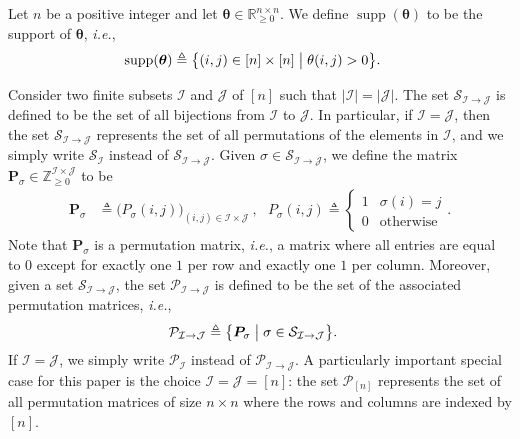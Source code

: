 \documentclass[journal,lettersize,twocolumn]{IEEEtran} %
\newcommand{\set}[1]{\mathcal{#1}}
\newcommand{\sR}{\mathbb{R}}
\newcommand{\sZ}{\mathbb{Z}}
\newcommand{\matr}[1]{ \bm{#1} }
\newcommand{\defeq}{ \triangleq }
\newcommand{\setP}{\set{P}}
\newcommand{\setS}{\set{S}}
\newcommand{\mtheta}{\matr{\theta}}
\newcommand{\sZp}{\sZ_{\geq 0}}
\newcommand{\mP}{\matr{P}}
\newcommand{\suppmtheta}{\operatorname{supp}(\mtheta)}
\newcommand{\ie}{\textit{i.e.}}
\begin{document}
%

Let $n$ be a positive integer and let $\mtheta \in \sR_{\geq 0}^{n \times
  n}$. We define $\suppmtheta$ to be the support of $\mtheta$, \ie,
\begin{align*}
  \suppmtheta 
    &\defeq
       \bigl\{ 
         (i,j) \in [n] \times [n] 
       \bigm|
         \theta(i,j) > 0
       \bigr\}.
\end{align*}

%

Consider two finite subsets $ \set{I} $ and $ \set{J} $ of $[n]$ such that
$ |\set{I}| = | \set{J} | $. The set $ \setS_{\set{I} \to \set{J}} $ is
defined to be the set of all bijections from $ \set{I} $ to $ \set{J} $. In
particular, if $ \set{I} = \set{J} $, then the set
$ \setS_{\set{I} \to \set{J}} $ represents the set of all permutations of the
elements in $ \set{I} $, and we simply write $ \setS_{\set{I}} $ instead of
$\setS_{\set{I} \to \set{J}}$. Given
$ \sigma \in \setS_{\set{I} \to \set{J}} $, we define the matrix
$ \mP_{\sigma} \in \sZp^{\set{I} \times \set{J}} $ to be
\begin{align}
  \mP_{\sigma} 
    &\defeq 
       \bigl(
         P_{\sigma}( i, j )
       \bigr)_{(i,j) \in \set{I} \times \set{J}} \ , 
       \ \ \ 
  P_{\sigma}( i, j )
     \defeq 
       \begin{cases}
         1 & \sigma(i) = j \\
         0 & \text{otherwise}
     \end{cases}.
       \label{sec:1:eqn:209}
\end{align}
Note that $\mP_{\sigma}$ is a permutation matrix, \ie, a matrix where all
entries are equal to $0$ except for exactly one $1$ per row and exactly one
$1$ per column. Moreover, given a set $ \setS_{\set{I} \to \set{J}} $, the set
$\setP_{\set{I} \to \set{J}}$ is defined to be the set of the associated
permutation matrices, \ie,
\begin{align}
  \setP_{\set{I} \to \set{J}}
    &\defeq
       \bigl\{ 
         \mP_{\sigma} 
       \bigm|
         \sigma \in \setS_{\set{I} \to \set{J}}
       \bigr\}. 
         \label{sec:1:eqn:181}
\end{align}
If $\set{I} = \set{J}$, we simply write $\setP_{\set{I}}$ instead of
$\setP_{\set{I} \to \set{J}}$. A particularly important special case for this
paper is the choice $\set{I} = \set{J} = [n]$: the set $\setP_{[n]}$
represents the set of all permutation matrices of size $n \times n$ where the
rows and columns are indexed by $[n]$.
\end{document}
